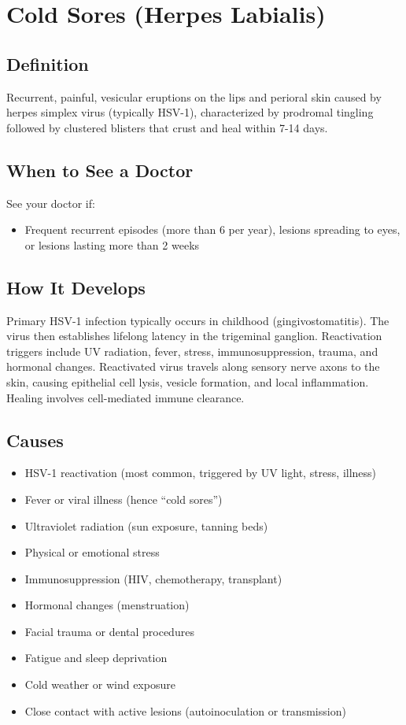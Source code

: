 \chapter{Cold Sores (Herpes Labialis)}

\section*{Definition}
Recurrent, painful, vesicular eruptions on the lips and perioral skin caused by herpes simplex virus (typically HSV-1), characterized by prodromal tingling followed by clustered blisters that crust and heal within 7-14 days.

\section*{When to See a Doctor}
See your doctor if:
\begin{itemize}
  \item Frequent recurrent episodes (more than 6 per year), lesions spreading to eyes, or lesions lasting more than 2 weeks
\end{itemize}

\section*{How It Develops}
Primary HSV-1 infection typically occurs in childhood (gingivostomatitis). The virus then establishes lifelong latency in the trigeminal ganglion. Reactivation triggers include UV radiation, fever, stress, immunosuppression, trauma, and hormonal changes. Reactivated virus travels along sensory nerve axons to the skin, causing epithelial cell lysis, vesicle formation, and local inflammation. Healing involves cell-mediated immune clearance.

\section*{Causes}
\begin{itemize}
  \item HSV-1 reactivation (most common, triggered by UV light, stress, illness)
  \item Fever or viral illness (hence ``cold sores'')
  \item Ultraviolet radiation (sun exposure, tanning beds)
  \item Physical or emotional stress
  \item Immunosuppression (HIV, chemotherapy, transplant)
  \item Hormonal changes (menstruation)
  \item Facial trauma or dental procedures
  \item Fatigue and sleep deprivation
  \item Cold weather or wind exposure
  \item Close contact with active lesions (autoinoculation or transmission)
\end{itemize}

